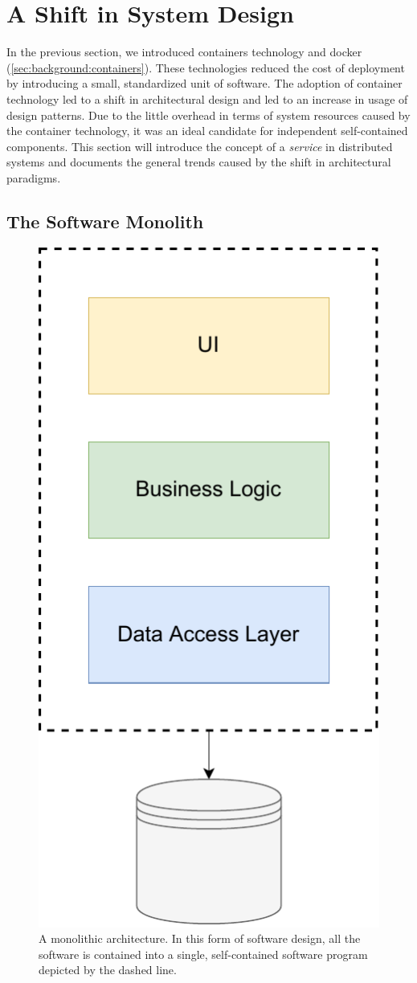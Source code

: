 \section{A Shift in System Design}
\label{sec:background:soa}

In the previous section, we introduced \glspl{container} technology and \Gls{docker} (\cref{sec:background:containers}). These technologies reduced the cost of deployment by introducing a small, standardized unit of software. The adoption of container technology led to a shift in architectural design and led to an increase in usage of  design patterns. Due to the little overhead in terms of system resources caused by the \gls{container} technology, it was an ideal candidate for independent self-contained components. This section will introduce the concept of a \textit{service} in distributed systems and documents the general trends caused by the shift in architectural paradigms.

\subsection{The Software Monolith}
\label{sec:background:soa:monolith}

\begin{figure}[!t]
    \centering
    
    \includegraphics[width=0.3\linewidth]{2_background/figures/monolith-architecture.pdf}

    \caption[A monolithic software architecture]{A monolithic architecture. In this form of software design, all the software is contained into a single, self-contained software program depicted by the dashed line. }
    \label{fig:monolithic-architecture}
\end{figure}


